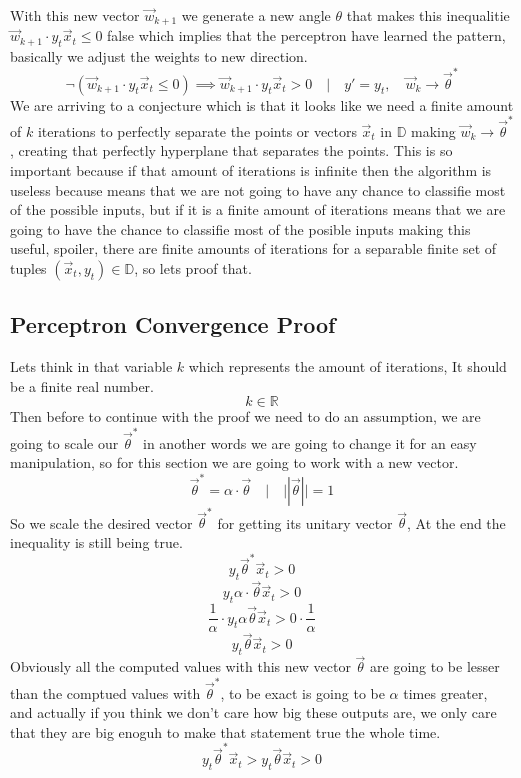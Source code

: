 With this new vector $\vec{w}_{k+1}$ we generate a new angle $\theta$ that makes
this inequalitie $\vec{w}_{k+1} \cdot y_t\vec{x}_t \le 0$
false 
which implies that the perceptron have learned the pattern, basically we adjust the weights
 to new direction.
\[
  \neg (\vec{w}_{k+1} \cdot y_t\vec{x}_t \le 0) \implies \vec{w}_{k+1} \cdot y_t\vec{x}_t > 0\quad |
  \quad y' = y_t, \quad \vec{w}_k \rightarrow \vec{\theta}^*
\]
We are arriving to a conjecture which is that it looks like we need a finite amount of $k$
iterations to perfectly separate the points or vectors $\vec{x}_t$ in $\mathbb{D}$
making $\vec{w}_k \rightarrow \vec{\theta}^*$, creating that perfectly
hyperplane that separates the points.
This is so important because if that amount of iterations is infinite then the
algorithm is useless because means that we are not going to have any chance to classifie most of
the possible inputs,
but if it is a finite amount of iterations means that we are going to have the chance to
classifie most of the posible inputs
making this useful,  spoiler, there are finite amounts of iterations for a separable finite
set of tuples $(\vec{x}_t, y_t) \in \mathbb{D}$, so lets proof that.
\subsection{Perceptron Convergence Proof}
\label{sec:perceptron-convergence-proof}
Lets think in that variable $k$ which represents the amount of iterations,
It should be a finite real number.
\[
  k \in \mathbb{R}
\]
Then before to continue with the proof we need to do an assumption,
we are going to scale our $\vec{\theta}^*$ in another words we are going to change it
for an easy manipulation,
so for this section we are going to work with a new vector.
\[
  \vec{\theta}^* = \alpha \cdot \vec{\theta}\quad |\quad ||\vec{\theta}|| = 1
\]
So we scale the desired vector $\vec{\theta}^*$ for getting its unitary vector $\vec{\theta}$,
At the end the inequality is still being true.
\[
  y_t\vec{\theta}^*\vec{x}_t > 0
\]
\[
  y_t\alpha\cdot\vec{\theta}\vec{x}_t > 0
\]
\[
  \frac{1}{\alpha} \cdot y_t\alpha\vec{\theta}\vec{x}_t > 0 \cdot \frac{1}{\alpha}
\]
\[
  y_t\vec{\theta}\vec{x}_t > 0
\]
Obviously all the computed values with this new vector $\vec{\theta}$ are going to be lesser than
the comptued values with $\vec{\theta}^*$, to be exact is going to be $\alpha$ times greater, and
actually if you think we don't care how big these outputs are, we only care
that they are big enoguh to make that statement true the whole time.
\[
  y_t\vec{\theta}^*\vec{x}_t > y_t\vec{\theta}\vec{x}_t > 0
\]

